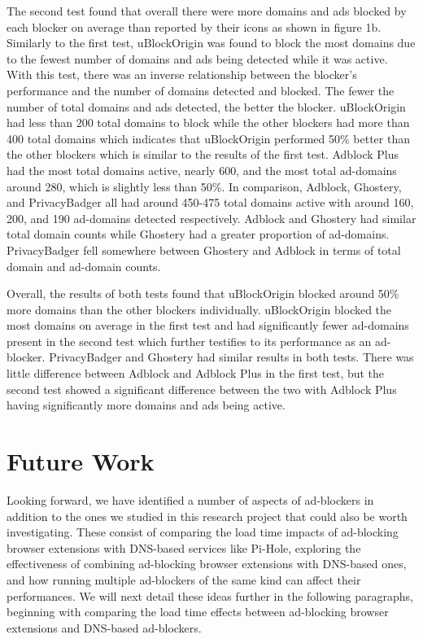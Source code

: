 \documentclass[sigsmall]{acmart}
\begin{document}
The second test found that overall there were more domains and ads blocked by each blocker on average than reported by their icons as shown in figure 1b. Similarly to the first test, uBlockOrigin was found to block the most domains due to the fewest number of domains and ads being detected while it was active. With this test, there was an inverse relationship between the blocker's performance and the number of domains detected and blocked. The fewer the number of total domains and ads detected, the better the blocker. uBlockOrigin had less than 200 total domains to block while the other blockers had more than 400 total domains which indicates that uBlockOrigin performed 50\% better than the other blockers which is similar to the results of the first test. Adblock Plus had the most total domains active, nearly 600, and the most total ad-domains around 280, which is slightly less than 50\%. In comparison, Adblock, Ghostery, and PrivacyBadger all had around 450-475 total domains active with around 160, 200, and 190 ad-domains detected respectively. Adblock and Ghostery had similar total domain counts while Ghostery had a greater proportion of ad-domains. PrivacyBadger fell somewhere between Ghostery and Adblock in terms of total domain and ad-domain counts.

Overall, the results of both tests found that uBlockOrigin blocked around 50\% more domains than the other blockers individually. uBlockOrigin blocked the most domains on average in the first test and had significantly fewer ad-domains present in the second test which further testifies to its performance as an ad-blocker. PrivacyBadger and Ghostery had similar results in both tests. There was little difference between Adblock and Adblock Plus in the first test, but the second test showed a significant difference between the two with Adblock Plus having significantly more domains and ads being active.

\section*{Future Work}
Looking forward, we have identified a number of aspects of ad-blockers in addition to the ones we studied in this research project that could also be worth investigating. These consist of comparing the load time impacts of ad-blocking browser extensions with DNS-based services like Pi-Hole, exploring the effectiveness of combining ad-blocking browser extensions with DNS-based ones, and how running multiple ad-blockers of the same kind can affect their performances. We will next detail these ideas further in the following paragraphs, beginning with comparing the load time effects between ad-blocking browser extensions and DNS-based ad-blockers.
\end{document}
